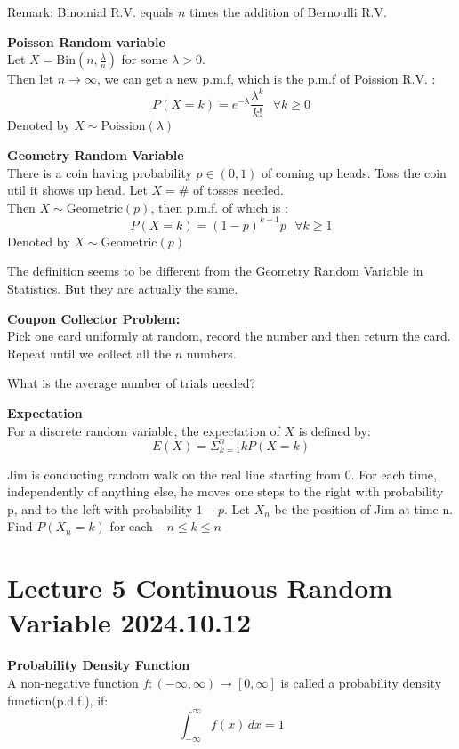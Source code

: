\documentclass{article}
\begin{document}
Remark: Binomial R.V. equals $n$ times the addition of Bernoulli R.V.


\begin{definition}
    \textbf{Poisson Random variable}\\
    Let $X = \text{Bin}(n,\frac{\lambda}{n})$ for some $\lambda > 0$.\\
    Then let $n \rightarrow \infty$, we can get a new p.m.f, which is the p.m.f of Poission R.V. :
    $$ P(X = k) = e^{-\lambda}\frac{\lambda^k}{k!} \textbf{ } \forall k \geq 0$$
    Denoted by $ X \sim \text{Poission}(\lambda)$
\end{definition}

\begin{definition}
    \textbf{Geometry Random Variable}\\
    There is a coin having probability $ p \in (0,1)$ of coming up heads. Toss the coin util it shows up head. Let $X = \#$ of tosses needed.\\
    Then $X \sim \text{Geometric}(p)$, then p.m.f. of which is :
    $$ P(X = k) = (1-p)^{k-1}p \text{ } \forall k \geq 1$$
    Denoted by $ X \sim \text{Geometric}(p)$
\end{definition}
The definition seems to be different from the Geometry Random Variable in Statistics. But they are actually the same.

\textbf{Coupon Collector Problem:}\\
Pick one card uniformly at random, record the number and then return the card. Repeat until we collect all the $n$ numbers.

What is the average number of trials needed?

\begin{definition}
    \textbf{Expectation}\\
    For a discrete random variable, the expectation of $X$ is defined by:
    $$ E(X) = \Sigma^n_{k=1}kP(X=k)$$
\end{definition}

\begin{quiz}
    Jim is conducting random walk on the real line starting from 0. For each time, independently of anything else, he moves one steps to the right with probability p, and to the left with probability $1-p$. Let $X_n$ be the position of Jim at time n. Find $P(X_n = k)$ for each $-n \leq k \leq n$
\end{quiz}




\section{Lecture 5 Continuous Random Variable 2024.10.12}
\begin{definition}
    \textbf{Probability Density Function}\\
    A non-negative function $f: (-\infty, \infty) \longrightarrow [0,\infty]$ is called a probability density function(p.d.f.), if:
    $$ \int^{\infty}_{-\infty} f(x) \, dx = 1$$
\end{definition}
\end{document}
